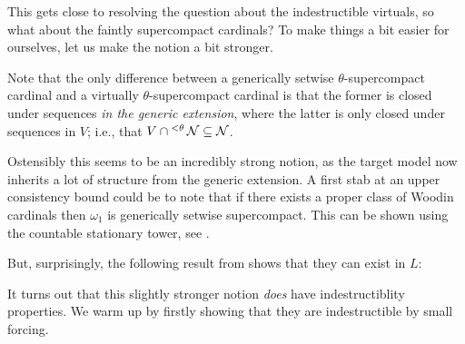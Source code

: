 \documentclass[../../main]{subfiles}
\begin{document}

This gets close to resolving the question about the indestructible virtuals, so what about the faintly supercompact cardinals? To make things a bit easier for ourselves, let us make the notion a bit stronger.


Note that the only difference between a generically setwise $\theta$-supercompact cardinal and a virtually $\theta$-supercompact cardinal is that the former is closed under sequences \textit{in the generic extension}, where the latter is only closed under sequences in $V$; i.e., that $V\cap{^{<\theta}}\operatorname{\mathcal N}\subseteq\operatorname{\mathcal N}$.

\qquad Ostensibly this seems to be an incredibly strong notion, as the target model now inherits a lot of structure from the generic extension. A first stab at an upper consistency bound could be to note that if there exists a proper class of Woodin cardinals then $\omega_1$ is generically setwise supercompact. This can be shown using the countable stationary tower, see \cite{stationary-tower}.

\qquad But, surprisingly, the following result from \cite{usuba} shows that they can exist in $L$:


It turns out that this slightly stronger notion \textit{does} have indestructiblity properties. We warm up by firstly showing that they are indestructible by small forcing.
\end{document}

